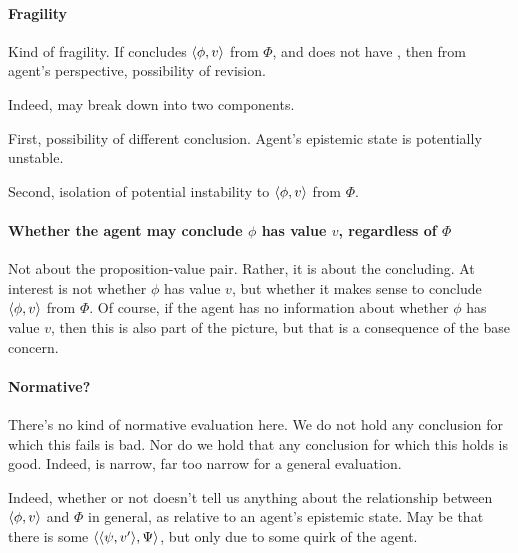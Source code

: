 \paragraph*{Fragility}

\begin{note}
  Kind of fragility.
  If concludes \(\langle \phi, v \rangle\) from \(\Phi\), and does not have \zS{}, then from agent's perspective, possibility of revision.

  Indeed, may break down into two components.

  First, possibility of different conclusion.
  Agent's epistemic state is potentially unstable.

  Second, isolation of potential instability to \(\langle \phi, v \rangle\) from \(\Phi\).
\end{note}

\paragraph*{Whether the agent may conclude \(\phi\) has value \(v\), regardless of \(\Phi\)}

\begin{note}
  Not about the proposition-value pair.
  Rather, it is about the concluding.
  At interest is not whether \(\phi\) has value \(v\), but whether it makes sense to conclude \(\langle \phi, v \rangle\) from \(\Phi\).
  Of course, if the agent has no information about whether \(\phi\) has value \(v\), then this is also part of the picture, but that is a consequence of the base concern.
\end{note}

\paragraph*{Normative?}

\begin{note}
  There's no kind of normative evaluation here.
  We do not hold any conclusion for which this fails is bad.
  Nor do we hold that any conclusion for which this holds is good.
  Indeed, \zS{} is narrow, far too narrow for a general evaluation.

  Indeed, whether or not \zS{} doesn't tell us anything about the relationship between \(\langle \phi, v \rangle\) and \(\Phi\) in general, as relative to an agent's epistemic state.
  May be that there is some \(\langle \langle \psi, v' \rangle, \Psi \rangle\), but only due to some quirk of the agent.
\end{note}

